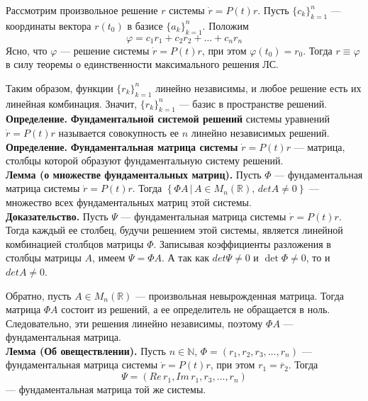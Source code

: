 \documentclass{article}
\begin{document}
Рассмотрим произвольное решение $r$ системы $\dot{r} = P(t)r$. Пусть $\{c_k\}_{k=1}^n$ --- координаты вектора $r(t_0)$ в базисе $\{a_k\}_{k=1}^n$. Положим
\begin{equation*}
    \varphi = c_1r_1 + c_2r_2 + \ldots + c_nr_n
\end{equation*}
Ясно, что $\varphi$ --- решение системы $\dot{r} = P(t)r$, при этом $\varphi(t_0) = r_0$. Тогда $r \equiv \varphi$ в силу теоремы о единственности максимального решения ЛС.

Таким образом, функции $\{r_k\}_{k=1}^n$ линейно независимы, и любое решение есть их линейная комбинация. Значит, $\{r_k\}_{k=1}^n$ --- базис в пространстве решений.\\

\noindent \textbf{Определение.} \textbf{Фундаментальной системой решений} системы уравнений $\dot{r} = P(t)r$ называется совокупность ее $n$ линейно независимых решений.\\

\noindent \textbf{Определение.} \textbf{Фундаментальная матрица системы} $\dot{r} = P(t)r$ --- матрица, столбцы которой образуют фундаментальную систему решений.\\

\noindent \textbf{Лемма (о множестве фундаментальных матриц).} Пусть $\Phi$ --- фундаментальная матрица системы $\dot{r} = P(t)r$. Тогда $\left\{\Phi A \, | \, A \in M_n(\mathbb{R}), \, detA \neq 0 \right\}$ --- множество всех фундаментальных матриц этой системы.\\

\noindent \textbf{Доказательство.} Пусть $\Psi$ --- фундаментальная матрица системы $\dot{r} = P(t)r$. Тогда каждый ее столбец, будучи решением этой системы, является линейной комбинацией столбцов матрицы $\Phi$. Записывая коэффициенты разложения в столбцы матрицы $A$, имеем $\Psi = \Phi A$. А так как $det \Psi \neq 0$ и $\det \Phi \neq 0$, то и $det A \neq 0$.

Обратно, пусть $A \in M_n(\mathbb{R})$ --- произвольная невырожденная матрица. Тогда матрица $\Phi A$ состоит из решений, а ее определитель не обращается в ноль. Следовательно, эти решения линейно независимы, поэтому $\Phi A$ --- фундаментальная матрица.\\

\noindent \textbf{Лемма (Об овеществлении).} Пусть $n \in \mathbb{N}$, $\Phi = (r_1,r_2,r_3,\ldots,r_n)$ --- фундаментальная матрица системы $\dot{r} = P(t)r$, при этом $r_1 = \overline{r}_2$. Тогда
\begin{equation*}
    \Psi = (Re\,r_1, Im\,r_1, r_3, \ldots, r_n)
\end{equation*}
--- фундаментальная матрица той же системы.\\
\end{document}
